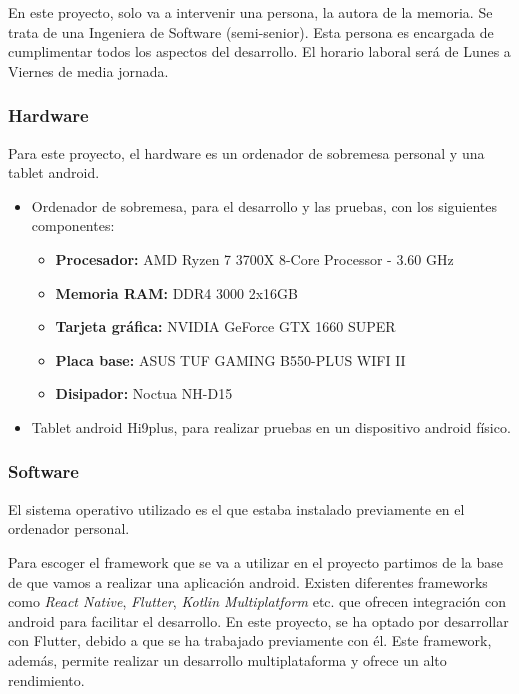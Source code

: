 \documentclass[a4paper, 12pt]{article}
\begin{document}
En este proyecto, solo va a intervenir una persona, la autora de la memoria. Se trata de una Ingeniera de Software (semi-senior). Esta persona es encargada de cumplimentar todos los aspectos del desarrollo. El horario laboral será de Lunes a Viernes de media jornada.


\subsubsection{Hardware}

Para este proyecto, el hardware es un ordenador de sobremesa personal y una tablet android.

\begin{itemize}[noitemsep]
	\item Ordenador de sobremesa, para el desarrollo y las pruebas, con los siguientes componentes:
		\begin{itemize}[noitemsep]
			\item \textbf{Procesador:} AMD Ryzen 7 3700X 8-Core Processor - 3.60 GHz
			\item \textbf{Memoria RAM:} DDR4 3000 2x16GB
			\item \textbf{Tarjeta gráfica:} NVIDIA GeForce GTX 1660 SUPER
			\item \textbf{Placa base:} ASUS TUF GAMING B550-PLUS WIFI II
			\item \textbf{Disipador:} Noctua NH-D15
		\end{itemize}
	\item Tablet android Hi9plus, para realizar pruebas en un dispositivo android físico.
\end{itemize}

\subsubsection{Software}

El sistema operativo utilizado es el que estaba instalado previamente en el ordenador personal.

Para escoger el framework que se va a utilizar en el proyecto partimos de la base de que vamos a realizar una aplicación android. Existen diferentes frameworks como \textit{React Native}, \textit{Flutter}, \textit{Kotlin Multiplatform} etc. que ofrecen integración con android para facilitar el desarrollo. En este proyecto, se ha optado por desarrollar con Flutter, debido a que se ha trabajado previamente con él. Este framework, además, permite realizar un desarrollo multiplataforma y ofrece un alto rendimiento. 
\end{document}
